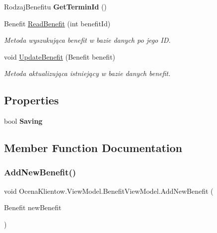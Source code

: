 \begin{DoxyCompactItemize}
Rodzaj\+Benefitu {\bfseries Get\+Termin\+Id} ()
\item 
Benefit \hyperlink{class_ocena_klientow_1_1_view_model_1_1_benefit_view_model_a820c19c8b1ca13a158ee775b325d8d44}{Read\+Benefit} (int benefit\+Id)
\begin{DoxyCompactList}\small\item\em Metoda wyszukująca benefit w bazie danych po jego ID. \end{DoxyCompactList}\item 
void \hyperlink{class_ocena_klientow_1_1_view_model_1_1_benefit_view_model_a2b803d785c29c965b8c120064a10d903}{Update\+Benefit} (Benefit benefit)
\begin{DoxyCompactList}\small\item\em Metoda aktualizująca istniejący w bazie danych benefit. \end{DoxyCompactList}\end{DoxyCompactItemize}
\subsection*{Properties}
\begin{DoxyCompactItemize}
\item 
\hypertarget{class_ocena_klientow_1_1_view_model_1_1_benefit_view_model_ad33c0198a2f7a4e8342505e57eba0ec5}{}\label{class_ocena_klientow_1_1_view_model_1_1_benefit_view_model_ad33c0198a2f7a4e8342505e57eba0ec5} 
bool {\bfseries Saving}
\end{DoxyCompactItemize}


\subsection{Member Function Documentation}
\hypertarget{class_ocena_klientow_1_1_view_model_1_1_benefit_view_model_ad8a6a78aa63e7cbd0bc677627b8c34b9}{}\label{class_ocena_klientow_1_1_view_model_1_1_benefit_view_model_ad8a6a78aa63e7cbd0bc677627b8c34b9} 
\subsubsection{\texorpdfstring{Add\+New\+Benefit()}{AddNewBenefit()}}
{\footnotesize\ttfamily void Ocena\+Klientow.\+View\+Model.\+Benefit\+View\+Model.\+Add\+New\+Benefit (\begin{DoxyParamCaption}\item[{Benefit}]{new\+Benefit }\end{DoxyParamCaption})\hspace{0.3cm}{\ttfamily [inline]}}



